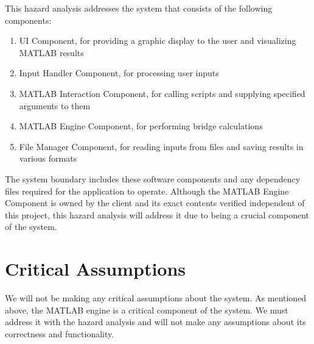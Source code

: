 \documentclass{article}
\begin{document}
This hazard analysis addresses the system that consists of the following components:

\begin{enumerate}
	\item UI Component, for providing a graphic display to the user and visualizing MATLAB results
	\item Input Handler Component, for processing user inputs
	\item MATLAB Interaction Component, for calling scripts and supplying specified arguments to them
	\item MATLAB Engine Component, for performing bridge calculations
	\item File Manager Component, for reading inputs from files and saving results in various formats
\end{enumerate}

The system boundary includes these software components and any dependency files required for the application to operate. Although the MATLAB Engine Component is owned by the client and its exact contents verified independent of this project, this hazard analysis will address it due to being a crucial component of the system.

\section{Critical Assumptions}

We will not be making any critical assumptions about the system. As mentioned above, the MATLAB engine 
is a critical component of the system. We must address it with the hazard analysis and will not make
any assumptions about its correctness and functionality.
\end{document}
